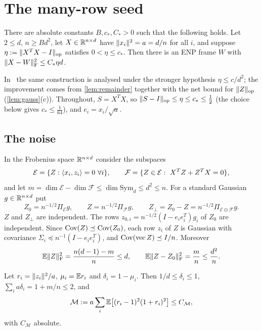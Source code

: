\section{The many-row seed}\label{sec:manyrow}

\begin{theorem}\label{thm:manyrow}
There are absolute constants $B,c_*,C_*>0$ such that the following holds. Let
$2\le d$, $n\ge Bd^2$, let $X\in\mathbb R^{n\times d}$ have $\lVert x_i\rVert^2=a=d/n$ for all
$i$, and suppose $\eta:=\lVert X^TX-I\rVert_{\mathrm{op}}$ satisfies $0<\eta\le c_*$. Then there is
an ENP frame $W$ with $\lVert X-W\rVert_{\mathrm F}^2\le C_*\eta d$.
\end{theorem}

In~\cite{Orig} the same construction is analysed under the stronger hypothesis
$\eta\le c/d^2$; the improvement comes from \cref{lem:remainder} together with
the net bound for $\lVert Z\rVert_{\mathrm{op}}$ (\cref{lem:gauss}(c)). Throughout, $S=X^TX$, so
$\lVert S-I\rVert_{\mathrm{op}}\le\eta\le c_*\le\frac12$ (the choice below gives $c_*\le\frac1{64}$), and
$e_i=x_i/\sqrt a$.

\subsection{The noise}

In the Frobenius space $\mathbb R^{n\times d}$ consider the subspaces
\[
 \mathcal E=\{Z:\langle x_i,z_i\rangle=0\ \forall i\},\qquad
 \mathcal F=\{Z\in\mathcal E:\ X^TZ+Z^TX=0\},
\]
and let $m=\dim\mathcal E-\dim\mathcal F\le\dim\mathrm{Sym}_d\le d^2\le n$. For a
standard Gaussian $g\in\mathbb R^{n\times d}$ put
\[
 Z_0=n^{-1/2}\Pi_{\mathcal E}g,\qquad Z=n^{-1/2}\Pi_{\mathcal F}g,\qquad
 Z_\perp=Z_0-Z=n^{-1/2}\Pi_{\mathcal E\ominus\mathcal F}g .
\]
$Z$ and $Z_\perp$ are independent. The rows $z_{0,i}=n^{-1/2}(I-e_ie_i^T)g_i$
of $Z_0$ are independent. Since $\operatorname{Cov}(Z)\preceq\operatorname{Cov}(Z_0)$, each row $z_i$ of
$Z$ is Gaussian with covariance $\Sigma_i\preceq n^{-1}(I-e_ie_i^T)$, and
$\operatorname{Cov}(\mathrm{vec}\,Z)\preceq I/n$. Moreover
\begin{equation}\label{eq:mr-noise}
 \mathbb E\lVert Z\rVert_{\mathrm F}^2=\frac{n(d-1)-m}{n}\le d,\qquad
 \mathbb E\lVert Z-Z_0\rVert_{\mathrm F}^2=\frac mn\le\frac{d^2}n .
\end{equation}

\begin{lemma}\label{lem:rowmoments}
Let $r_i=\lVert z_i\rVert^2/a$, $\mu_i=\mathbb E r_i$ and $\delta_i=1-\mu_i$. Then
$1/d\le\delta_i\le1$, $\sum_ia\delta_i=1+m/n\le2$, and
\[
 \mathcal M:=a\sum_i\mathbb E\bigl[(r_i-1)^2(1+r_i)^2\bigr]\le C_{\mathcal M},
\]
with $C_{\mathcal M}$ absolute.
\end{lemma}

